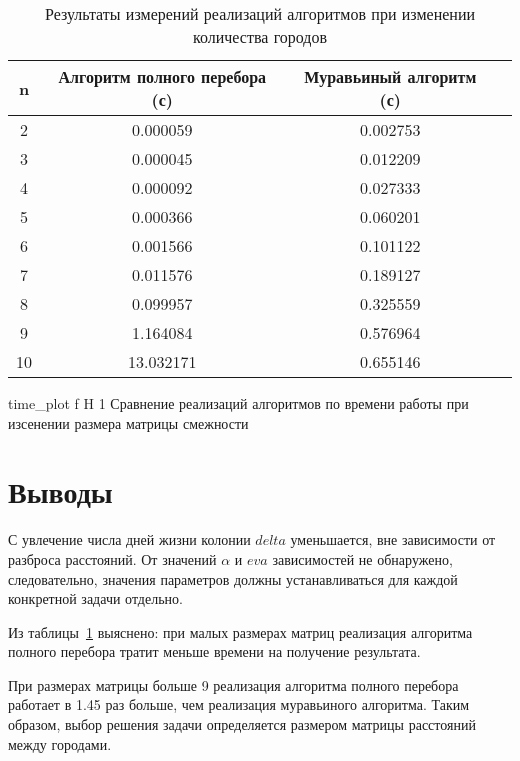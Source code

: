 \begin{table}[ht]
	\centering
	\caption{Результаты измерений реализаций алгоритмов при изменении количества городов}
	\begin{tabular}{|c|c|c|c|}
	\hline
	n & Алгоритм полного перебора (с) & Муравьиный алгоритм (с) \\ \hline
   2 &   0.000059 &   0.002753 \\ \hline
3 &   0.000045 &   0.012209 \\ \hline
4 &   0.000092 &   0.027333 \\ \hline
5 &   0.000366 &   0.060201 \\ \hline
6 &   0.001566 &   0.101122 \\ \hline
7 &   0.011576 &   0.189127 \\ \hline
8 &   0.099957 &   0.325559 \\ \hline
9 &   1.164084 &   0.576964 \\ \hline
10 &  13.032171 &   0.655146 \\ \hline

	\end{tabular}
\label{t:timings}
\end{table}

	{time_plot} 
	{f} 
	{H} 
	{1\textwidth} 
	{Сравнение реализаций алгоритмов по времени работы при изсенении размера матрицы смежности}

\section*{Выводы}
С увлечение числа дней жизни колонии $delta$ уменьшается, вне зависимости от разброса расстояний. 
От значений $\alpha$ и $eva$ зависимостей не обнаружено, следовательно, значения параметров должны устанавливаться для каждой конкретной задачи отдельно. 

Из таблицы~\ref{t:timings} выяснено: при малых размерах матриц реализация алгоритма полного перебора тратит меньше времени на получение результата.

При размерах матрицы больше 9 реализация алгоритма полного перебора работает в 1.45 раз больше, чем реализация муравьиного алгоритма.
Таким образом, выбор решения задачи определяется размером матрицы расстояний между городами.
